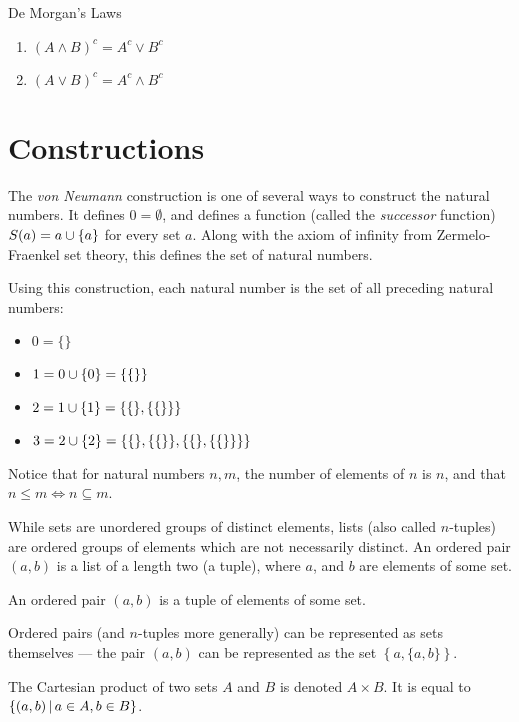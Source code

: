 \begin{thm}{De Morgan's Laws}\label{demorgan-set}\proofbreak
    \begin{enumerate}
        \item $(A \land B)^{c} = A^{c} \lor B^{c}$
        \item $(A \lor B)^{c} = A^{c} \land B^{c}$
    \end{enumerate}
\end{thm}

\section{Constructions}

The \emph{von Neumann} construction is one of several ways to construct the natural numbers. It defines $0 = \emptyset$, and defines a function (called the \emph{successor} function) $S(a) = a \cup \{a\}$ for every set $a$. Along with the axiom of infinity from Zermelo-Fraenkel set theory, this defines the set of natural numbers.

Using this construction, each natural number is the set of all preceding natural numbers:
\begin{itemize}
    \item $0 = \{\}$
    \item $1 = 0 \cup \{0\} = \{\{\}\}$
    \item $2 = 1 \cup \{1\} = \{\{\}, \{\{\}\}\}$
    \item $3 = 2 \cup \{2\} = \{\{\}, \{\{\}\}, \{\{\}, \{\{\}\}\}\}$
\end{itemize}

Notice that for natural numbers $n, m$, the number of elements of $n$ is $n$, and that $n \leq m \iff n \subseteq m$.

While sets are unordered groups of distinct elements, lists (also called $n$-tuples) are ordered groups of elements which are not necessarily distinct. An ordered pair $(a, b)$ is a list of a length two (a tuple), where $a$, and $b$ are elements of some set.

\begin{defn}\label{tuple}
    An ordered pair $(a, b)$ is a tuple of elements of some set.
\end{defn}

Ordered pairs (and $n$-tuples more generally) can be represented as sets themselves --- the pair $(a, b)$ can be represented as the set $\left\{a, \{a, b\}\right\}$.

\begin{defn}\label{cartesian-product}
    The Cartesian product of two sets $A$ and $B$ is denoted $A \times B$. It is equal to $\left\{\left(a, b\right) \,\middle|\, a \in A, b \in B \right\}$.
\end{defn}

